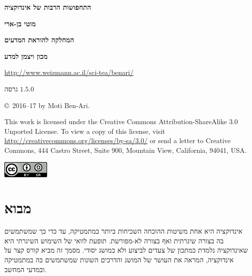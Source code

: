 
\thispagestyle{empty}

\begin{center}
\textbf{\LARGE התחפושות הרבות של אינדוקציה}

\bigskip
\bigskip

\textbf{\Large מוטי בן-ארי}

\bigskip

\textbf{\large המחלקה להוראת המדעים}

\smallskip

\textbf{\large מכון ויצמן למדע}

\bigskip

\url{http://www.weizmann.ac.il/sci-tea/benari/}

\bigskip

\large{גרסה
$1.5.0$}
\end{center}

\bigskip

\begin{center}
\copyright{}\  2016--17 by Moti Ben-Ari.
\end{center}

This work is licensed under the Creative Commons Attribution-ShareAlike 3.0 Unported License. To view a copy of this license, visit \url{http://creativecommons.org/licenses/by-sa/3.0/} or send a letter to Creative Commons, 444 Castro Street, Suite 900, Mountain View, California, 94041, USA.

\begin{center}
\includegraphics[width=.2\textwidth]{../../by-sa.png}
\end{center}


\setcounter{tocdepth}{0}
\tableofcontents


\chapter[מבוא]{\vspace*{-2ex}מבוא}\label{s.intro}

\vspace*{-4ex}

אינדוקציה היא אחת משיטות ההוכחה השכיחות ביותר במתמטיקה, עד כדי כך שמשתמשים בה בצורה שיגרתית ואף בצורה לא-מפורשת. תופעת לוואי של השימוש השיגרתי היא שאינדוקציה נלמדת כמתכון של צעדים לביצוע ולא כמושג יסודי. מסמך זה מביא קורס קצר על אינדוקציה, המראה את העושר של המושג והדרכים השונות שמשתמשים בה במתמטיקה ובמדעי המחשב.

